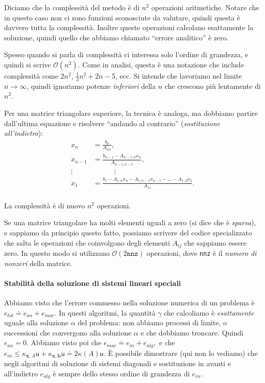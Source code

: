 \documentclass[a4paper]{report}
\theoremstyle{definition}
\theoremstyle{remark}
\newcommand{\x}{\mathbf{x}}
\renewcommand{\b}{\mathbf{b}}
\begin{document}
Diciamo che la complessità del metodo è di $n^2$ operazioni aritmetiche. Notare che in questo caso non ci sono funzioni sconosciute da valutare, quindi questa è davvero tutta la complessità. Inoltre queste operazioni calcolano esattamente la soluzione, quindi quello che abbiamo chiamato ``errore analitico'' è zero.

Spesso quando si parla di complessità ci interessa solo l'ordine di grandezza, e quindi si scrive $\mathcal{O}(n^2)$. Come in analisi, questa è una notazione che include complessità come $2n^2$, $\frac{1}{3}n^2 + 2n - 5$, ecc. Si intende che lavoriamo nel limite $n\to \infty$, quindi ignoriamo potenze \emph{inferiori} della $n$ che crescono più lentamente di $n^2$. 

Per una matrice triangolare superiore, la tecnica è analoga, ma dobbiamo partire dall'ultima equazione e risolvere ``andando al contrario'' (\emph{sostituzione all'indietro}):
\begin{align*}
x_n &= \frac{b_n}{A_{nn}},\\
x_{n-1} &= \frac{b_{n-1} - A_{n-1,n}x_n}{A_{n-1,n-1}},\\
\vdots & \quad \quad \quad \vdots\\
x_1 &= \frac{b_1 - A_{1,n}x_n - A_{1,n-1}x_{n-1} - \dots -A_{1,2}x_{2}}{A_{11}}.\\
\end{align*}

La complessità è di nuovo $n^2$ operazioni.

Se una matrice triangolare ha molti elementi uguali a zero (si dice che è \emph{sparsa}), e sappiamo da principio questo fatto, possiamo scrivere del codice specializzato che salta le operazioni che coinvolgono degli elementi $A_{ij}$ che sappiamo essere zero. In questo modo si utilizzano $\mathcal{O}(2\texttt{nnz})$ operazioni, dove \texttt{nnz} è il \emph{numero di nonzeri} della matrice.

\paragraph{Stabilità della soluzione di sistemi lineari speciali} Abbiamo visto che l'errore commesso nella soluzione numerica di un problema è $e_{tot} \doteq e_{an} + e_{mac}$. In questi algoritmi, la quantità $\gamma$ che calcoliamo è \emph{esattamente} uguale alla soluzione $\alpha$ del problema: non abbiamo processi di limite, o successioni che convergono alla soluzione $\alpha$ e che dobbiamo troncare. Quindi $e_{an} = 0$. Abbiamo visto poi che 
$e_{mac} \doteq e_{in} + e_{alg},$ e che $e_{in} \leq \kappa_{\x,A}\mathsf{u} + \kappa_{\x,\b} \mathsf{u} \doteq 2\kappa(A)\mathsf{u}$. È possibile dimostrare (qui non lo vediamo) che negli algoritmi di soluzione di sistemi diagonali e sostituzione in avanti e all'indietro $e_{alg}$ è sempre dello stesso ordine di grandezza di $e_{in}$.
\end{document}
